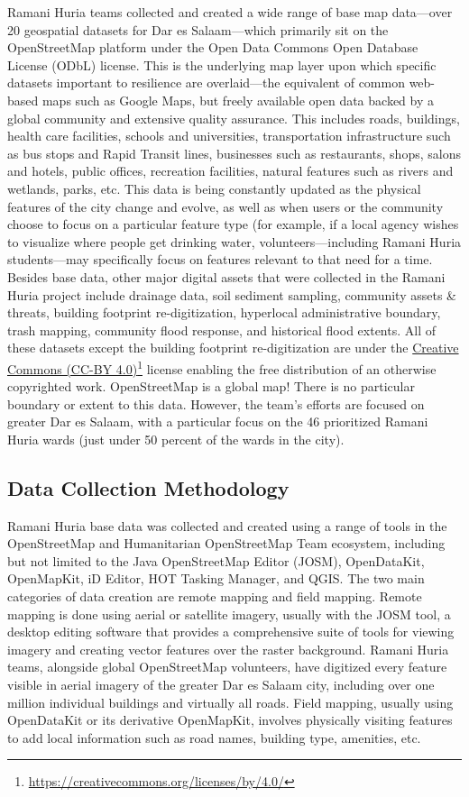 \documentclass[a4paper,12pt,twoside]{article}
\begin{document}
\begin{multicols}{2}
Ramani Huria teams collected and created a wide range of base map data—over 20 geospatial datasets for Dar es Salaam—which primarily sit on the OpenStreetMap platform under the Open Data Commons Open Database License (ODbL) license. This is the underlying map layer upon which specific datasets important to resilience are overlaid—the equivalent of common web-based maps such as Google Maps, but freely available open data backed by a global community and extensive quality assurance.
This includes roads, buildings, health care facilities, schools and universities, transportation infrastructure such as bus stops and Rapid Transit lines, businesses such as restaurants, shops, salons and hotels, public offices, recreation facilities, natural features such as rivers and wetlands, parks, etc. This data is being constantly updated as the physical features of the city change and evolve, as well as when users or the community choose to focus on a particular feature type (for example, if a local agency wishes to visualize where people get drinking water, volunteers—including Ramani Huria students—may specifically focus on features relevant to that need for a time.
Besides base data, other major digital assets that were collected in the Ramani Huria project include drainage data, soil sediment sampling, community assets & threats, building footprint re-digitization, hyperlocal administrative boundary, trash mapping, community flood response, and historical flood extents. All of these datasets except the building footprint re-digitization are under the \href{https://creativecommons.org/licenses/by/4.0/}{Creative Commons (CC-BY 4.0)}\footnote{\url{https://creativecommons.org/licenses/by/4.0/}} license enabling the free distribution of an otherwise copyrighted work.
OpenStreetMap is a global map! There is no particular boundary or extent to this data. However, the team’s efforts are focused on greater Dar es Salaam, with a particular focus on the 46 prioritized Ramani Huria wards (just under 50 percent of the wards in the city).
\end{multicols}
\newpage
\subsection{Data Collection Methodology}
Ramani Huria base data was collected and created using a range of tools in the OpenStreetMap and Humanitarian OpenStreetMap Team ecosystem, including but not limited to the Java OpenStreetMap Editor (JOSM), OpenDataKit, OpenMapKit, iD Editor, HOT Tasking Manager, and QGIS. 
The two main categories of data creation are remote mapping and field mapping. Remote mapping is done using aerial or satellite imagery, usually with the JOSM tool, a desktop editing software that provides a comprehensive suite of tools for viewing imagery and creating vector features over the raster background. Ramani Huria teams, alongside global OpenStreetMap volunteers, have digitized every feature visible in aerial imagery of the greater Dar es Salaam city, including over one million individual buildings and virtually all roads.
Field mapping, usually using OpenDataKit or its derivative OpenMapKit, involves physically visiting features to add local information such as road names, building type, amenities, etc.
\end{document}
